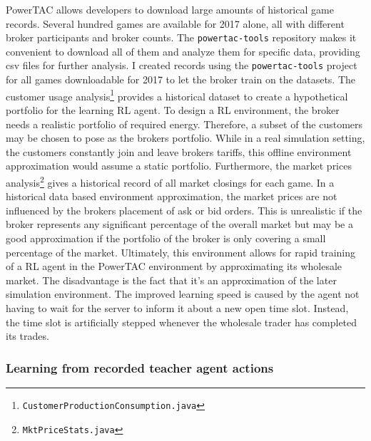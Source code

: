 \ac{PowerTAC} allows developers to download large amounts of historical game records. Several hundred games are
available for 2017 alone, all with different broker participants and broker counts. The \texttt{powertac-tools}
repository makes it convenient to download all  of them and analyze them for specific data, providing csv files for
further analysis. I created records using the \texttt{powertac-tools} project for all games downloadable for 2017 to let the
broker train on the datasets.  The customer usage analysis\footnote{\texttt{CustomerProductionConsumption.java}}
provides a historical dataset to create a hypothetical portfolio for the learning \ac{RL} agent. To design a \ac{RL}
environment, the broker needs a realistic portfolio of required energy. Therefore, a subset of the customers may be
chosen to pose as the brokers portfolio. While in a real simulation setting, the customers constantly join and leave
brokers tariffs, this offline environment approximation would assume a static portfolio. Furthermore, the market prices
analysis\footnote{\texttt{MktPriceStats.java}} gives a historical record of all market closings for each game. In a
historical data based environment approximation, the market prices are not influenced by the brokers placement of ask
or bid orders. This is unrealistic if the broker represents any significant percentage of the overall market but may be
a good approximation if the portfolio of the broker is only covering a small percentage of the market. Ultimately, this
environment allows for rapid training of a \ac{RL} agent in the \ac{PowerTAC} environment by approximating its wholesale
market. The disadvantage is the fact that it's an approximation of the later simulation environment. The improved learning speed 
is caused by the agent not having to wait for the server to inform it about a new open time slot. Instead, the
time slot is artificially stepped whenever the wholesale trader has completed its trades.

\subsubsection{Learning from recorded teacher agent actions}%
\label{ssub:learning_from_historical_actions_of_teacher_agents}

